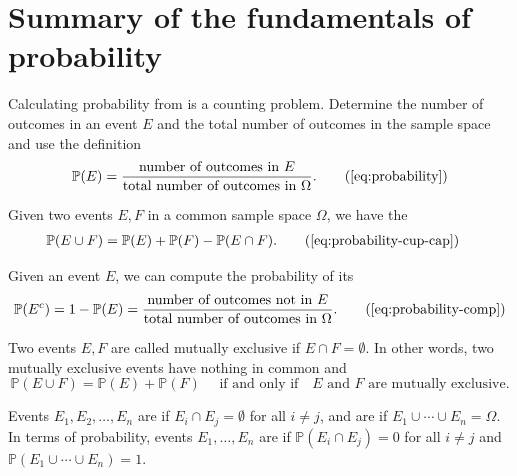 \documentclass[../main.tex]{subfiles}
\begin{document}
 \section{Summary of the fundamentals of probability}

Calculating probability from   is a counting problem. Determine the number of outcomes in an event \(E\) and the total number of outcomes in the sample space and use the definition
\begin{equation}
  \mathbb{P}(E) = \frac{\text{number of outcomes in \(E\)}}{\text{total number of outcomes in \(\Omega\)}}. \tag{\ref{eq:probability}}
\end{equation}

Given two events \(E,F\) in a common sample space \(\Omega\), we have the 
\begin{align}
  \mathbb{P}(E \cup F) 
  &= \mathbb{P}(E) + \mathbb{P}(F) - \mathbb{P}(E \cap F). \tag{\ref{eq:probability-cup-cap}}
\end{align}

Given an event \(E\), we can compute the probability of its 
\begin{equation}
  \mathbb{P}(E^{c}) = 1 - \mathbb{P}(E) = \frac{\text{number of outcomes not in \(E\)}}{\text{total number of outcomes in \(\Omega\)}}. 
  \tag{\ref{eq:probability-comp}}
\end{equation}

Two events \(E,F\) are called mutually exclusive if \(E \cap F = \emptyset\). In other words, two mutually exclusive events have nothing in common and
\[
\mathbb{P}(E \cup F) = \mathbb{P}(E) + \mathbb{P}(F) \quad\text{ if and only if}\quad \text{\(E\) and \(F\) are mutually exclusive}.
\]

Events \(E_{1}, E_{2}, \ldots, E_{n}\) are    if \(E_{i} \cap E_{j} = \emptyset\) for all \(i \ne j\), and are  if \(E_{1} \cup \cdots \cup E_{n} = \Omega\).  In terms of  probability, events \(E_{1}, \ldots, E_{n}\) are  if \(\mathbb{P}(E_{i} \cap E_{j}) = 0\) for all \(i \ne j\) and \(\mathbb{P}(E_{1} \cup \cdots \cup E_{n}) = 1\).  
\end{document}
